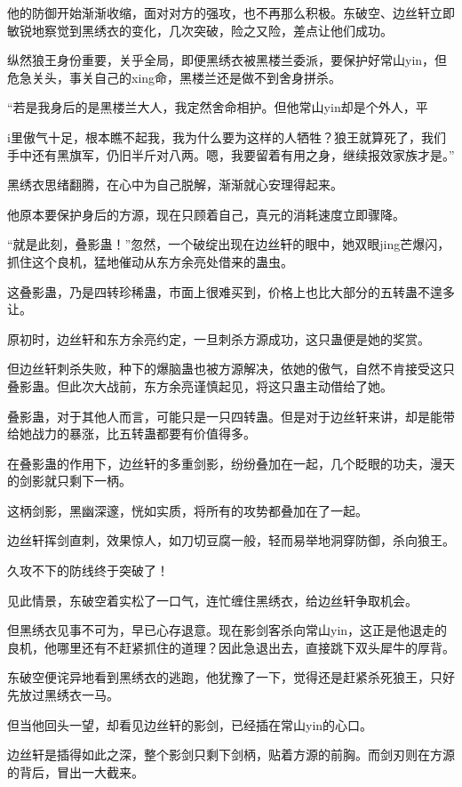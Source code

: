 \begin{this_body}
他的防御开始渐渐收缩，面对对方的强攻，也不再那么积极。东破空、边丝轩立即敏锐地察觉到黑绣衣的变化，几次突破，险之又险，差点让他们成功。

纵然狼王身份重要，关乎全局，即便黑绣衣被黑楼兰委派，要保护好常山yin，但危急关头，事关自己的xing命，黑楼兰还是做不到舍身拼杀。

“若是我身后的是黑楼兰大人，我定然舍命相护。但他常山yin却是个外人，平

i里傲气十足，根本瞧不起我，我为什么要为这样的人牺牲？狼王就算死了，我们手中还有黑旗军，仍旧半斤对八两。嗯，我要留着有用之身，继续报效家族才是。”

黑绣衣思绪翻腾，在心中为自己脱解，渐渐就心安理得起来。

他原本要保护身后的方源，现在只顾着自己，真元的消耗速度立即骤降。

“就是此刻，叠影蛊！”忽然，一个破绽出现在边丝轩的眼中，她双眼jing芒爆闪，抓住这个良机，猛地催动从东方余亮处借来的蛊虫。

这叠影蛊，乃是四转珍稀蛊，市面上很难买到，价格上也比大部分的五转蛊不遑多让。

原初时，边丝轩和东方余亮约定，一旦刺杀方源成功，这只蛊便是她的奖赏。

但边丝轩刺杀失败，种下的爆脑蛊也被方源解决，依她的傲气，自然不肯接受这只叠影蛊。但此次大战前，东方余亮谨慎起见，将这只蛊主动借给了她。

叠影蛊，对于其他人而言，可能只是一只四转蛊。但是对于边丝轩来讲，却是能带给她战力的暴涨，比五转蛊都要有价值得多。

在叠影蛊的作用下，边丝轩的多重剑影，纷纷叠加在一起，几个眨眼的功夫，漫天的剑影就只剩下一柄。

这柄剑影，黑幽深邃，恍如实质，将所有的攻势都叠加在了一起。

边丝轩挥剑直刺，效果惊人，如刀切豆腐一般，轻而易举地洞穿防御，杀向狼王。

久攻不下的防线终于突破了！

见此情景，东破空着实松了一口气，连忙缠住黑绣衣，给边丝轩争取机会。

但黑绣衣见事不可为，早已心存退意。现在影剑客杀向常山yin，这正是他退走的良机，他哪里还有不赶紧抓住的道理？因此急退出去，直接跳下双头犀牛的厚背。

东破空便诧异地看到黑绣衣的逃跑，他犹豫了一下，觉得还是赶紧杀死狼王，只好先放过黑绣衣一马。

但当他回头一望，却看见边丝轩的影剑，已经插在常山yin的心口。

边丝轩是插得如此之深，整个影剑只剩下剑柄，贴着方源的前胸。而剑刃则在方源的背后，冒出一大截来。


\end{this_body}
